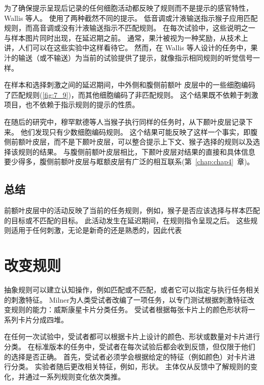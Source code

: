 为了确保提示呈现后记录的任何细胞活动都反映了规则而不是提示的感官特性，Wallis 等人。
使用了两种截然不同的提示。
低音调或汁液输送指示猴子应用匹配规则，而高音调或没有汁液输送指示不匹配规则。
在每次试验中，这些说明之一与样本图片同时出现，在延迟期之前。 
通常，果汁被视为一种奖励，从技术上讲，人们可以在这些实验中这样看待它。
然而，在 Wallis 等人设计的任务中，果汁的输送（或不输送）为当前的试验提供了提示，就像指示相同规则的听觉信号一样。
\par


在样本和选择刺激之间的延迟期间，中外侧和腹侧前额叶 皮层中的一些细胞编码了匹配规则(\ref{fig:7_9})，而其他细胞编码了非匹配规则。 
这个结果既不依赖于刺激项目，也不依赖于指示规则的提示的性质\cite{wallis2001single}。
\par


在随后的研究中，穆罕默德等人\cite{muhammad2006comparison}当猴子执行同样的任务时，从下颞叶皮层记录下来。 
他们发现只有少数细胞编码规则。
这个结果可能反映了这样一个事实，即腹侧前额叶皮层，而不是下颞叶皮层，可以整合提示上下文、猴子选择的规则以及选择该规则的结果。
与腹侧前额叶皮层相比，下颞叶皮层对结果的直接和具体信息要少得多，腹侧前额叶皮层与眶额皮层有广泛的相互联系(第~\ref{chap:chap4}~章)。



\subsection{总结}
\par
前额叶皮层中的活动反映了当前的任务规则，例如，猴子是否应该选择与样本匹配的目标或不匹配的目标。
此活动发生在延迟期间，在规则指令呈现之后。
这些规则适用于任何刺激，无论是新奇的还是熟悉的，因此代表



\section{改变规则}
\par
抽象规则可以建立认知操作，例如匹配或不匹配，或者它可以指定与执行任务相关的刺激特征。 
Milner\cite{milner1963effects}为人类受试者改编了一项任务，以专门测试根据刺激特征改变规则的能力：威斯康星卡片分类任务。 
受试者根据每张卡片上的颜色形状将一系列卡片分成四堆。
\par


在任何一次试验中，受试者都可以根据卡片上设计的颜色、形状或数量对卡片进行分类。 
在标准版本的任务中，受试者在每次试验后都会收到反馈，但仅限于他们的选择是否正确。 
首先，受试者必须学会根据给定的特征（例如颜色）对卡片进行分类。 
实验者随后更改相关特征，例如，形状。 
主体仅从反馈中了解规则的变化，并通过一系列规则变化依次类推。
\par


